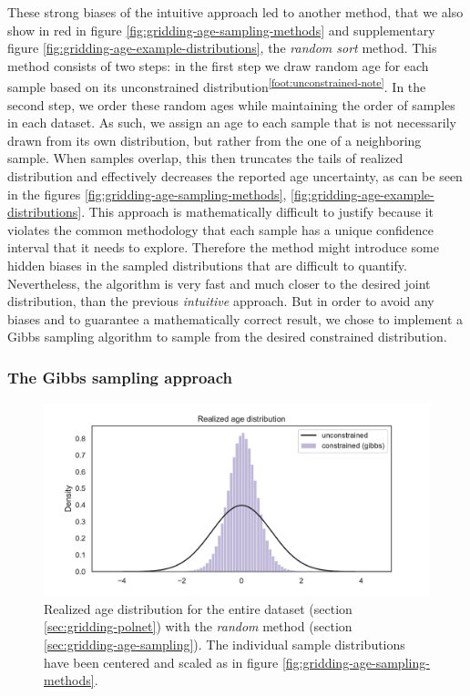 \documentclass[
11pt, %
english, %
singlespacing, %
headsepline, %
]{MastersDoctoralThesis} %
\begin{document}
\begin{NoHyper}
\begin{refsection}
These strong biases of the intuitive approach led to another method, that we also show in red in figure \ref{fig:gridding-age-sampling-methods} and supplementary figure \ref{fig:gridding-age-example-distributions}, the \textit{random sort} method. This method consists of two steps: in the first step we draw random age for each sample based on its unconstrained distribution\textsuperscript{\ref{foot:unconstrained-note}}. In the second step, we order these random ages while maintaining the order of samples in each dataset. As such, we assign an age to each sample that is not necessarily drawn from its own distribution, but rather from the one of a neighboring sample. When samples overlap, this then truncates the tails of realized distribution and effectively decreases the reported age uncertainty, as can be seen in the figures \ref{fig:gridding-age-sampling-methods}, \ref{fig:gridding-age-example-distributions}. This approach is mathematically difficult to justify because it violates the common methodology that each sample has a unique confidence interval that it needs to explore. Therefore the method might introduce some hidden biases in the sampled distributions that are difficult to quantify. Nevertheless, the algorithm is very fast and much closer to the desired joint distribution, than the previous \textit{intuitive} approach. But in order to avoid any biases and to guarantee a mathematically correct result, we chose to implement a Gibbs sampling algorithm to sample from the desired constrained distribution.


\subsubsection{The Gibbs sampling approach}

\begin{figure}
	\includegraphics[width=\linewidth]{gridding-figures/full-realized-age-distribution.pdf}
	\caption[Realized age distribution for the entire dataset]{Realized age distribution for the entire dataset (section \ref{sec:gridding-polnet}) with the \textit{random} method (section \ref{sec:gridding-age-sampling}). The individual sample distributions have been centered and scaled as in figure \ref{fig:gridding-age-sampling-methods}.}
	\label{fig:gridding-full-age-distribution}
\end{figure}


\end{refsection}
\end{NoHyper}
\end{document}
